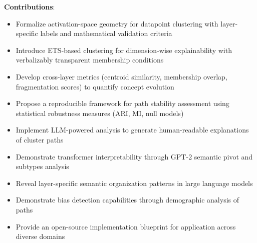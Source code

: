\textbf{Contributions}:
\begin{itemize}
    \item Formalize activation-space geometry for datapoint clustering with layer-specific labels and mathematical validation criteria
    \item Introduce ETS-based clustering for dimension-wise explainability with verbalizably transparent membership conditions
    \item Develop cross-layer metrics (centroid similarity, membership overlap, fragmentation scores) to quantify concept evolution
    \item Propose a reproducible framework for path stability assessment using statistical robustness measures (ARI, MI, null models)
    \item Implement LLM-powered analysis to generate human-readable explanations of cluster paths
    \item Demonstrate transformer interpretability through GPT-2 semantic pivot and subtypes analysis
    \item Reveal layer-specific semantic organization patterns in large language models
    \item Demonstrate bias detection capabilities through demographic analysis of paths
    \item Provide an open-source implementation blueprint for application across diverse domains
\end{itemize}